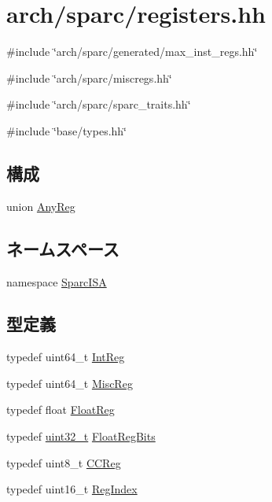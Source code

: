 \hypertarget{sparc_2registers_8hh}{
\section{arch/sparc/registers.hh}
\label{sparc_2registers_8hh}
}
{\ttfamily \#include \char`\"{}arch/sparc/generated/max\_\-inst\_\-regs.hh\char`\"{}}\par
{\ttfamily \#include \char`\"{}arch/sparc/miscregs.hh\char`\"{}}\par
{\ttfamily \#include \char`\"{}arch/sparc/sparc\_\-traits.hh\char`\"{}}\par
{\ttfamily \#include \char`\"{}base/types.hh\char`\"{}}\par
\subsection*{構成}
\begin{DoxyCompactItemize}
\item 
union \hyperlink{unionSparcISA_1_1AnyReg}{AnyReg}
\end{DoxyCompactItemize}
\subsection*{ネームスペース}
\begin{DoxyCompactItemize}
\item 
namespace \hyperlink{namespaceSparcISA}{SparcISA}
\end{DoxyCompactItemize}
\subsection*{型定義}
\begin{DoxyCompactItemize}
\item 
typedef uint64\_\-t \hyperlink{namespaceSparcISA_a0e080577527fb3e9685399f75b5caf15}{IntReg}
\item 
typedef uint64\_\-t \hyperlink{namespaceSparcISA_aa16539aa6584fd12f7d6fa868f75b4de}{MiscReg}
\item 
typedef float \hyperlink{namespaceSparcISA_a449d6bb660f5ca613cf359f05d81a20f}{FloatReg}
\item 
typedef \hyperlink{Type_8hh_a435d1572bf3f880d55459d9805097f62}{uint32\_\-t} \hyperlink{namespaceSparcISA_acc2693113a7cf1a4ff1c9d63b7de6451}{FloatRegBits}
\item 
typedef uint8\_\-t \hyperlink{namespaceSparcISA_a5834599c0196ce4accda8049e7320621}{CCReg}
\item 
typedef uint16\_\-t \hyperlink{namespaceSparcISA_a69329e1d929a534ff51be6cf8216b69a}{RegIndex}
\end{DoxyCompactItemize}
